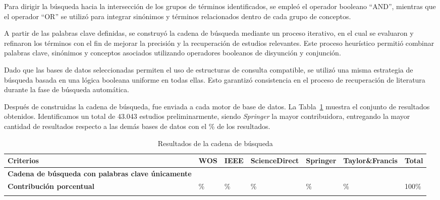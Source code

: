 
Para dirigir la búsqueda hacia la intersección de los grupos de términos identificados, se empleó el operador booleano ``AND'', mientras 
que el operador ``OR'' se utilizó para integrar sinónimos y términos relacionados dentro de cada grupo de conceptos. 

A partir de las palabras clave definidas, se construyó la cadena de búsqueda mediante un proceso iterativo, en el cual se evaluaron y 
refinaron los términos con el fin de mejorar la precisión y la recuperación de estudios relevantes. Este proceso heurístico permitió 
combinar palabras clave, sinónimos y conceptos asociados utilizando operadores booleanos de disyunción y conjunción.

Dado que las bases de datos seleccionadas permiten el uso de estructuras de consulta compatible, se utilizó una misma estrategia de
búsqueda basada en una lógica booleana uniforme en todas ellas. Esto garantizó consistencia en el proceso de recuperación de 
literatura durante la fase de búsqueda automática.

Después de construidas la cadena de búsqueda, fue enviada a cada motor de base de datos. La Tabla~\ref{table:search_results} 
muestra el conjunto de resultados obtenidos. Identificamos un total de 43.043 estudios preliminarmente, siendo \textit{Springer} la mayor 
contribuidora, entregando la mayor cantidad de resultados respecto a las demás bases de datos con el \sprp\% de los resultados.


\begin{table}[htbp]
	\centering
	\renewcommand{\arraystretch}{1}  %
	\begin{tabular}{p{4.8cm}p{1.7cm}p{1.7cm}p{1.7cm}p{1.7cm}p{2cm}p{1.4cm}}
		\toprule
		\textbf{Criterios}                                        & \textbf{WOS} & \textbf{IEEE} & \textbf{ScienceDirect} & \textbf{Springer} & \textbf{Taylor\&Francis} & \textbf{Total} \\
		\midrule
		\textbf{Cadena de búsqueda con palabras clave únicamente} & \wos{}       & \ieee{}       & \sd{}                  & \spr{}            & \tf{}                    & \tot{}         \\
		\addlinespace[0.8em]
		\textbf{Contribución porcentual}                          & \wosp{}\%    & \ieeep{}\%    & \sdp{}\%               & \sprp{}\%         & \tfp{}\%                 & 100\%          \\
		\bottomrule
		\vspace{2pt}
	\end{tabular}
	\caption{Resultados de la cadena de búsqueda}\label{table:search_results}
\end{table}


